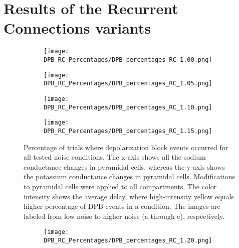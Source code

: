 \section{Results of the Recurrent Connections variants}
\begin{figure}[H]
    \centering
    \begin{subfigure}{0.48\textwidth}
        \texttt{[image: DPB\_RC\_Percentages/DPB\_percentages\_RC\_1.00.png]}
        \caption{} %
    \end{subfigure}\hfill
    \begin{subfigure}{0.48\textwidth}
        \texttt{[image: DPB\_RC\_Percentages/DPB\_percentages\_RC\_1.05.png]}
        \caption{} %
    \end{subfigure}

    \bigskip %

    \begin{subfigure}{0.48\textwidth}
        \texttt{[image: DPB\_RC\_Percentages/DPB\_percentages\_RC\_1.10.png]}
        \caption{} %
    \end{subfigure}\hfill
    \begin{subfigure}{0.48\textwidth}
        \texttt{[image: DPB\_RC\_Percentages/DPB\_percentages\_RC\_1.15.png]}
        \caption{} %
    \end{subfigure}

    \caption[RC DPB percentage matrices (all)]{Percentage of trials where depolarization block events occurred for all tested noise conditions.
        The x-axis shows all the sodium conductance changes in pyramidal cells, whereas the y-axis shows the potassium conductance changes in pyramidal cells.
        Modifications to pyramidal cells were applied to all compartments.
        The color intensity shows the average delay, where high-intensity yellow equals higher percentage of DPB events in a condition.
        The images are labeled from low noise to higher noise (a through e), respectively.}\label{fig:rc_dpb_percentage_matrices}
\end{figure}

\begin{figure}[H] \ContinuedFloat
    \centering
    \begin{subfigure}{0.48\textwidth}
        \texttt{[image: DPB\_RC\_Percentages/DPB\_percentages\_RC\_1.20.png]}
        \caption{} %
    \end{subfigure}\hfill
\end{figure}
